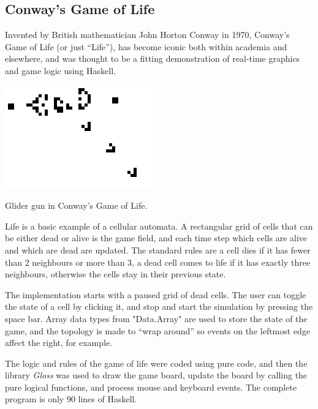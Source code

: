 \subsection{Conway's Game of Life}

Invented by British mathematician John Horton Conway in 1970, Conway's Game of Life (or just ``Life''), has become iconic both within academia and elsewhere, and was thought to be a fitting demonstration of real-time graphics and game logic using Haskell. 

\begin{marginfigure}
	\includegraphics{res/conway/conway.png}
	\caption[Glider gun in Conway's Game of Life]{Glider gun in Conway's Game of Life.}
	\label{fig:glidergun}
\end{marginfigure}

Life is a basic example of a cellular automata. A rectangular grid of cells that can be either dead or alive is the game field, and each time step which cells are alive and which are dead are updated. The standard rules are a cell dies if it has fewer than 2 neighbours or more than 3, a dead cell comes to life if it has exactly three neighbours, otherwise the cells stay in their previous state.

The implementation starts with a paused grid of dead cells. The user can toggle the state of a cell by clicking it, and stop and start the simulation by pressing the space bar. Array data types from "Data.Array" are used to store the state of the game, and the topology is made to ``wrap around'' so events on the leftmost edge affect the right, for example.

The logic and rules of the game of life were coded using pure code, and then the library \emph{Gloss} was used to draw the game board, update the board by calling the pure logical functions, and process mouse and keyboard events. The complete program is only 90 lines of Haskell.

